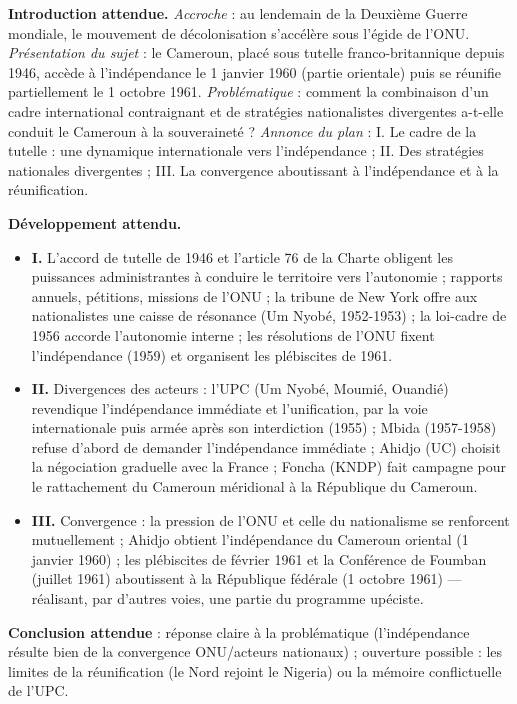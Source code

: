 \documentclass[11pt]{article}
\begin{document}
\begin{corrige}
\textbf{Introduction attendue.} \emph{Accroche} : au lendemain de la Deuxième Guerre mondiale, le mouvement de décolonisation s'accélère sous l'égide de l'ONU. \emph{Présentation du sujet} : le Cameroun, placé sous tutelle franco-britannique depuis 1946, accède à l'indépendance le 1\ier{} janvier 1960 (partie orientale) puis se réunifie partiellement le 1\ier{} octobre 1961. \emph{Problématique} : comment la combinaison d'un cadre international contraignant et de stratégies nationalistes divergentes a-t-elle conduit le Cameroun à la souveraineté ? \emph{Annonce du plan} : I. Le cadre de la tutelle : une dynamique internationale vers l'indépendance ; II. Des stratégies nationales divergentes ; III. La convergence aboutissant à l'indépendance et à la réunification.

\textbf{Développement attendu.}
\begin{itemize}
\item \textbf{I.} L'accord de tutelle de 1946 et l'article 76 de la Charte obligent les puissances administrantes à conduire le territoire vers l'autonomie ; rapports annuels, pétitions, missions de l'ONU ; la tribune de New York offre aux nationalistes une caisse de résonance (Um Nyobé, 1952-1953) ; la loi-cadre de 1956 accorde l'autonomie interne ; les résolutions de l'ONU fixent l'indépendance (1959) et organisent les plébiscites de 1961.
\item \textbf{II.} Divergences des acteurs : l'UPC (Um Nyobé, Moumié, Ouandié) revendique l'indépendance immédiate et l'unification, par la voie internationale puis armée après son interdiction (1955) ; Mbida (1957-1958) refuse d'abord de demander l'indépendance immédiate ; Ahidjo (UC) choisit la négociation graduelle avec la France ; Foncha (KNDP) fait campagne pour le rattachement du Cameroun méridional à la République du Cameroun.
\item \textbf{III.} Convergence : la pression de l'ONU et celle du nationalisme se renforcent mutuellement ; Ahidjo obtient l'indépendance du Cameroun oriental (1\ier{} janvier 1960) ; les plébiscites de février 1961 et la Conférence de Foumban (juillet 1961) aboutissent à la République fédérale (1\ier{} octobre 1961) — réalisant, par d'autres voies, une partie du programme upéciste.
\end{itemize}
\textbf{Conclusion attendue} : réponse claire à la problématique (l'indépendance résulte bien de la convergence ONU/acteurs nationaux) ; ouverture possible : les limites de la réunification (le Nord rejoint le Nigeria) ou la mémoire conflictuelle de l'UPC.


\end{corrige}
\end{document}

